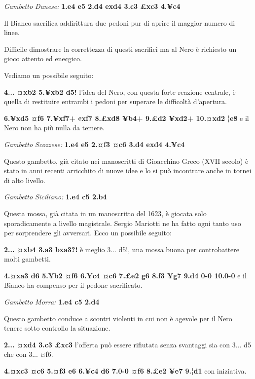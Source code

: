 \emph{Gambetto Danese:} \textbf{1.e4 e5 2.d4 exd4 3.c3 £xc3 4.¥c4}


Il Bianco sacrifica addirittura due pedoni pur di aprire il maggior
numero di linee.

Difficile dimostrare la correttezza di questi sacrifici ma al Nero è
richiesto un gioco attento ed ene¢gico.

Vediamo un possibile seguito:

\textbf{4... ¤xb2 5.¥xb2 d5!} l'idea del Nero, con questa forte reazione
centrale, è quella di restituire entrambi i pedoni per superare le
difficoltà d'apertura.

\textbf{6.¥xd5 ¤f6 7.¥xf7+ ¢xf7 8.£xd8 ¥b4+ 9.£d2 ¥xd2+ 10.¤xd2 ¦e8} e
il Nero non ha più nulla da temere.

\emph{Gambetto Scozzese:} \textbf{1.e4 e5 2.¤f3 ¤c6 3.d4 exd4 4.¥c4}


Questo gambetto, già citato nei manoscritti di Gioacchino Greco (XVII
secolo) è stato in anni recenti arricchito di nuove idee e lo si può
incontrare anche in tornei di alto livello.

\emph{Gambetto Siciliano:} \textbf{1.e4 c5 2.b4}


Questa mossa, già citata in un manoscritto del 1623, è giocata solo
sporadicamente a livello magistrale. Sergio Mariotti ne ha fatto ogni
tanto uso per sorprendere gli avversari. Ecco un possibile seguito:

\textbf{2... ¤xb4 3.a3 bxa3?!} è meglio 3... d5!, una mossa buona per
controbattere molti gambetti.

\textbf{4.¤xa3 d6 5.¥b2 ¤f6 6.¥c4 ¤c6 7.£e2 g6 8.f3 ¥g7 9.d4 0-0 10.0-0}
e il Bianco ha compenso per il pedone sacrificato.

\emph{Gambetto Morra:} \textbf{1.e4 c5 2.d4}


Questo gambetto conduce a scontri violenti in cui non è agevole per il
Nero tenere sotto controllo la situazione.

\textbf{2... ¤xd4 3.c3 £xc3} l'offerta può essere rifiutata senza
svantaggi sia con 3... d5 che con 3... ¤f6.

\textbf{4.¤xc3 ¤c6 5.¤f3 e6 6.¥c4 d6 7.0-0 ¤f6 8.£e2 ¥e7 9.¦d1} con
iniziativa.


